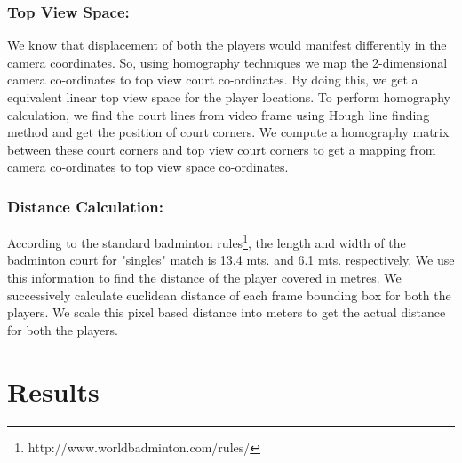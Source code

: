 \documentclass[runningheads,a4paper]{llncs}
\begin{document}
\subsubsection*{Top View Space:} We know that displacement of both the players would manifest differently in the camera coordinates. So, using homography techniques we map the 2-dimensional camera co-ordinates to top view court co-ordinates. By doing this, we get a equivalent linear top view space for the player locations. To perform homography calculation, we find the court lines from video frame using Hough line finding method and get the position of court corners. We compute a homography matrix between these court corners and top view court corners to get a mapping from camera co-ordinates to top view space co-ordinates.

\subsubsection*{Distance Calculation:} According to the standard badminton rules\footnote{http://www.worldbadminton.com/rules/}, the length and width of the badminton court for "singles" match is 13.4 mts. and 6.1 mts. respectively. We use this information to find the distance of the player covered in metres. We successively calculate euclidean distance of each frame bounding box for both the players. We scale this pixel based distance into meters to get the actual distance for both the players.
\section{Results}
\end{document}
